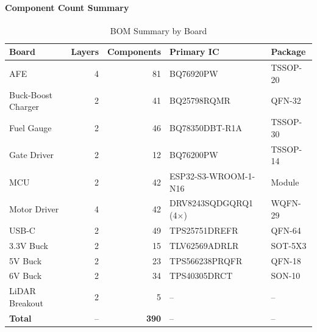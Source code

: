 \paragraph{Component Count Summary}
\begin{table}[H]
\centering
\caption{BOM Summary by Board}
\label{tab:bom-summary}
\begin{tabular}{@{}lrrll@{}}
\toprule
\textbf{Board} & \textbf{Layers} & \textbf{Components} & \textbf{Primary IC} & \textbf{Package} \\
\midrule
AFE & 4 & 81 & BQ76920PW & TSSOP-20 \\
Buck-Boost Charger & 2 & 41 & BQ25798RQMR & QFN-32 \\
Fuel Gauge & 2 & 46 & BQ78350DBT-R1A & TSSOP-30 \\
Gate Driver & 2 & 12 & BQ76200PW & TSSOP-14 \\
MCU & 2 & 42 & ESP32-S3-WROOM-1-N16 & Module \\
Motor Driver & 4 & 42 & DRV8243SQDGQRQ1 (4$\times$) & WQFN-29 \\
USB-C & 2 & 49 & TPS25751DREFR & QFN-64 \\
3.3V Buck & 2 & 15 & TLV62569ADRLR & SOT-5X3 \\
5V Buck & 2 & 23 & TPS566238PRQFR & QFN-18 \\
6V Buck & 2 & 34 & TPS40305DRCT & SON-10 \\
LiDAR Breakout & 2 & 5 & -- & -- \\
\midrule
\textbf{Total} & -- & \textbf{390} & -- & -- \\
\bottomrule
\end{tabular}
\end{table}

